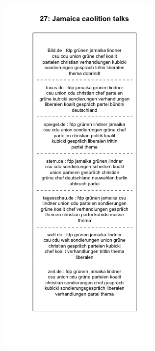 \documentclass[12pt,a4paper,notitlepage]{article}
\begin{document}
\begin{figure}[H]
\begin{center}
\begin{subfigure}[normla]{0.49\textwidth}
		\end{subfigure}
		\begin{subfigure}[normla]{0.49\textwidth}
			\includegraphics[width=\textwidth]{../figs/plotquote27.png}
		\end{subfigure}
	\end{center}
\end{figure}
\end{document}
